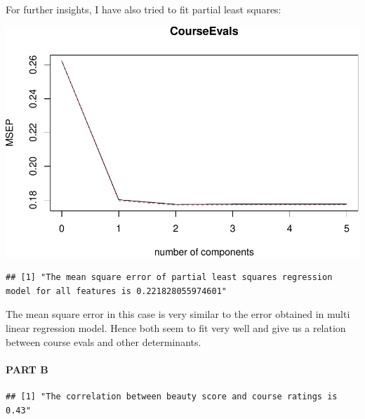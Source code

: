 \documentclass[
]{article}
\begin{document}
For further insights, I have also tried to fit partial least squares:

\begin{center}\includegraphics{Disha_Gandhi_Take_Home_Exam_PDF_files/figure-latex/unnamed-chunk-96-1} \end{center}

\begin{verbatim}
## [1] "The mean square error of partial least squares regression model for all features is 0.221828055974601"
\end{verbatim}

The mean square error in this case is very similar to the error obtained
in multi linear regression model. Hence both seem to fit very well and
give us a relation between course evals and other determinants.

\hypertarget{part-b-6}{%
\paragraph{\texorpdfstring{{PART B}}{PART B}}\label{part-b-6}}

\begin{verbatim}
## [1] "The correlation between beauty score and course ratings is 0.43"
\end{verbatim}
\end{document}
